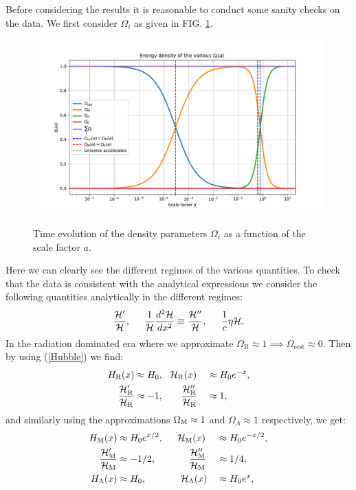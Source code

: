 \documentclass[%
reprint,
 amsmath,amssymb,
 aps,
]{revtex4-2}
\newcommand{\Hp}{\mathcal{H}}
\begin{document}
Before considering the results it is reasonable to conduct some sanity checks on the data. We first consider $\Omega_i$ as given in FIG. \ref{Omegai}.
\begin{figure}[H]
	\caption{Time evolution of the density parameters $\Omega_i$ as a function of the scale factor $a$.}
	\includegraphics[width = \linewidth]{Figures/Omega_i.pdf}
	\label{Omegai}
\end{figure}
Here we can clearly see the different regimes of the various quantities. To check that the data is consistent with the analytical expressions we consider the following quantities analytically in the different regimes:
\[\frac{\Hp'}{\Hp},\hspace{5mm}\frac{1}{\Hp}\frac{d^2\Hp}{dx^2}\equiv\frac{\Hp''}{\Hp},\hspace{5mm}\frac{1}{c}\eta\Hp.\]
In the radiation dominated era where we approximate $\Omega_{\text{R}}\approx1\implies\Omega_\text{rest}\approx0$. Then by using (\ref{Hubble}) we find:
\begin{alignat*}{2}
	H_{\text{R}}(x)&\approx H_0,~~\Hp_{\text{R}}(x)&&\approx H_0e^{-x},\\
	\frac{\Hp_{\text{R}}'}{\Hp_{\text{R}}}&\approx-1,\hspace{6.5mm}\frac{\Hp_{\text{R}}''}{\Hp_{\text{R}}}&&\approx1,
\end{alignat*}
and similarly using the approximations $\Omega_{\text M}\approx1$ and $\Omega_\Lambda\approx1$ respectively, we get:
\begin{alignat*}{2}
	H_\text{M}(x)&\approx H_0e^{x/2},\hspace{5mm}\Hp_\text M(x)&&\approx H_0e^{-x/2},\\
	\frac{\Hp_\text M'}{\Hp_\text M}&\approx-1/2,\hspace{12mm}\frac{\Hp_\text M''}{\Hp_\text M}&&\approx1/4,\\
	H_\Lambda(x)&\approx H_0,\hspace{12.5mm}\Hp_\Lambda(x)&&\approx H_0e^{x},
\end{alignat*}
\end{document}
